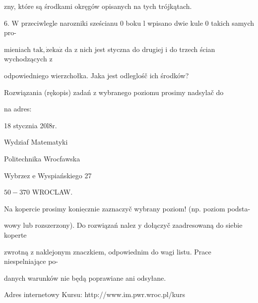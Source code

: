 \documentclass[a4paper,12pt]{article}
\begin{document}
zny, które są środkami okręgów opisanych na tych trójkątach.

6. $\mathrm{W}$ przeciwlegle narozniki sześcianu $0$ boku l wpisano dwie kule $0$ takich samych pro-

mieniach $\mathrm{t}\mathrm{a}\mathrm{k}, \dot{\mathrm{z}}\mathrm{e}\mathrm{k}\mathrm{a}\dot{\mathrm{z}}$ da $\mathrm{z}$ nich jest styczna do drugiej $\mathrm{i}$ do trzech ścian wychodzących $\mathrm{z}$

odpowiedniego wierzchołka. Jaka jest odleglośč ich środków?

Rozwiązania (rękopis) zadań z wybranego poziomu prosimy nadsylač do

na adres:

18 stycznia 20l8r.

Wydziaf Matematyki

Politechnika Wrocfawska

Wybrzez $\mathrm{e}$ Wyspiańskiego 27

$50-370$ WROCLAW.

Na kopercie prosimy $\underline{\mathrm{k}\mathrm{o}\mathrm{n}\mathrm{i}\mathrm{e}\mathrm{c}\mathrm{z}\mathrm{n}\mathrm{i}\mathrm{e}}$ zaznaczyč wybrany poziom! (np. poziom podsta-

wowy lub rozszerzony). Do rozwiązań nalez $\mathrm{y}$ dołączyč zaadresowaną do siebie koperte

zwrotną $\mathrm{z}$ naklejonym znaczkiem, odpowiednim do wagi listu. Prace niespelniające po-

danych warunków nie będą poprawiane ani odsyłane.

Adres internetowy Kursu: http://www.im.pwr.wroc.pl/kurs
\end{document}
